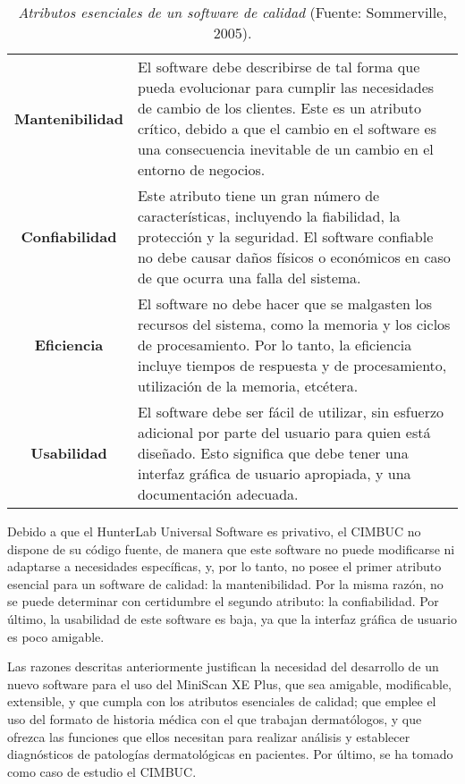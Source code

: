 		\begin{table}[t]
			\small
			\caption[Atributos esenciales de un software de calidad]{\textit{Atributos esenciales de un software de calidad} (Fuente: Sommerville, 2005).}
			\centering
			\setlength{\extrarowheight}{\altocelda}
			\begin{tabulary}{\anchotabla}{|c|J|}
				
				\hline
				 & \\ \hline
			\textbf{Mantenibilidad} & El software debe describirse de tal forma que pueda evolucionar  para cumplir las necesidades de cambio de los 					clientes. Este es un atributo cr\'{i}tico, debido a que el cambio en el software es una consecuencia inevitable de un cambio en el entorno de negocios.\\ \hline
			\textbf{Confiabilidad} & Este atributo tiene un gran n\'{u}mero de caracter\'{i}sticas, incluyendo la fiabilidad, la protecci\'{o}n y la seguridad. El software confiable no debe causar da\~{n}os f\'{i}sicos o econ\'{o}micos en caso de que ocurra una falla del sistema.\\ \hline
			\textbf{Eficiencia} & El software no debe hacer que se malgasten los recursos del sistema, como la memoria y los ciclos de procesamiento. Por lo tanto, la eficiencia incluye tiempos de respuesta y de procesamiento, utilizaci\'{o}n de la memoria, etc\'{e}tera.\\ \hline
			\textbf{Usabilidad} & El software debe ser f\'{a}cil de utilizar, sin esfuerzo adicional por parte del usuario para quien est\'{a} dise\~{n}ado. Esto significa que debe tener una interfaz gr\'{a}fica de usuario apropiada, y una documentaci\'{o}n adecuada.\\ \hline
			\end{tabulary}
		\end{table}

Debido a que el HunterLab Universal Software es privativo, el CIMBUC no dispone de su c\'{o}digo fuente, de manera que este software no puede modificarse ni adaptarse a necesidades espec\'{i}ficas, y, por lo tanto, no posee el primer atributo esencial para un software de calidad: la mantenibilidad. Por la misma raz\'{o}n, no se puede determinar con certidumbre el segundo atributo: la confiabilidad. Por \'{u}ltimo, la usabilidad de este software es baja, ya que la interfaz gr\'{a}fica de usuario es poco amigable.

Las razones descritas anteriormente justifican la necesidad del desarrollo de un nuevo software para el uso del MiniScan XE Plus, que sea amigable, modificable, extensible, y que cumpla con los atributos esenciales de calidad; que emplee el uso del formato de historia m\'{e}dica con el que trabajan dermat\'{o}logos, y que ofrezca las funciones que ellos necesitan para realizar an\'{a}lisis y establecer diagn\'{o}sticos de patolog\'{i}as dermatol\'{o}gicas en pacientes. Por \'{u}ltimo, se ha tomado como caso de estudio el CIMBUC.